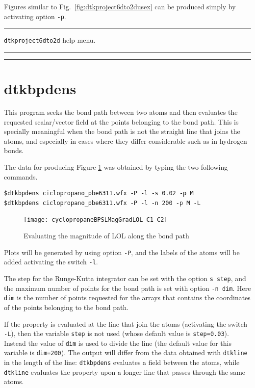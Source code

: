 Figures similar to Fig.~\ref{fig:dtkproject6dto2dusex} can be produced simply by activating
option \texttt{-p}.


\rule{\textwidth}{1pt}
{\center\texttt{dtkproject6dto2d} help menu.\\}
\rule{\textwidth}{1pt}
\begin{footnotesize}
\end{footnotesize}
\rule{\textwidth}{1pt}

\section{dtkbpdens}

This program seeks the bond path between two atoms and then evaluates the requested scalar/vector field at the points belonging to the bond path. This is specially meaningful when the bond path is not the straight line that joins the atoms, and especially in cases where they differ considerable such as in hydrogen bonds.

The data for producing Figure \ref{fig:dtkbpdensusex} was obtained by typing the two following commands.
\begin{lstlisting}
$dtkbpdens ciclopropano_pbe6311.wfx -P -l -s 0.02 -p M
$dtkbpdens ciclopropano_pbe6311.wfx -P -l -n 200 -p M -L
\end{lstlisting}
%
\begin{figure}[ht!]
\centering
\texttt{[image: cyclopropaneBPSLMagGradLOL-C1-C2]}
\caption{Evaluating the magnitude of LOL along the bond path}\label{fig:dtkbpdensusex}
\end{figure}
%

Plots will be generated by using option \texttt{-P}, and the labels of the atoms will be added activating the switch \texttt{-l}.

The step for the Runge-Kutta integrator can be set with the option \texttt{s step}, and the maximum number of points for the bond path is set with option \texttt{-n dim}. Here \texttt{dim} is the number of points requested for the arrays that contains the coordinates of the points belonging to the bond path.

If the property is evaluated at the line that join the atoms (activating the switch
\texttt{-L}), then the variable \texttt{step} is not used (whose default value is \texttt{step=0.03}).
Instead the value of \texttt{dim} is used to divide the line (the default value
for this variable is \texttt{dim=200}). The output will differ from the data obtained
with \texttt{dtkline} in the length of the line: \texttt{dtkbpdens} evaluates a field
between the atoms, while \texttt{dtkline} evaluates the property upon a longer line
that passes through the same atoms.

